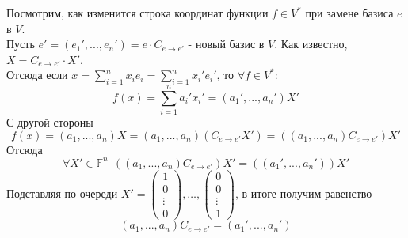     Посмотрим, как изменится строка координат функции $f\in V^{*}$ при замене базиса $e$ в $V$.\\
    Пусть $e' = (e_1',...,e_n') = e\cdot C_{e\rightarrow e'}$ - новый базис в $V$. 
    Как известно, $X = C_{e\rightarrow e'} \cdot X'$.\\
    Отсюда если $x = \sum \limits_{i=1}^n x_i e_i = \sum \limits_{i=1}^n x_i' e_i'$, то $\forall f \in V^{*}:$
    $$f(x) = \sum \limits_{i=1}^n a_i' x_i' = (a_1',...,a_n')X'$$
    С другой стороны
    $$f(x) = (a_1,...,a_n)X = (a_1,...,a_n)(C_{e\rightarrow e'}X') = ((a_1,...,a_n)C_{e\rightarrow e'})X'$$ 
    Отсюда
    $$\forall X' \in \mathbb{F}^n \ \ ((a_1,...,a_n)C_{e\rightarrow e'})X' = ((a_1',...,a_n'))X'$$ 
    Подставляя по очереди $X' = \left( \begin{smallmatrix} 1 \\ 0 \\ \vdots \\ 0 \end{smallmatrix} \right), \dots , \left( \begin{smallmatrix} 0 \\ 0 \\ \vdots \\ 1 \end{smallmatrix}\right)$, в итоге получим равенство \[(a_1,...,a_n)C_{e\rightarrow e'} = (a_1',...,a_n')\]

